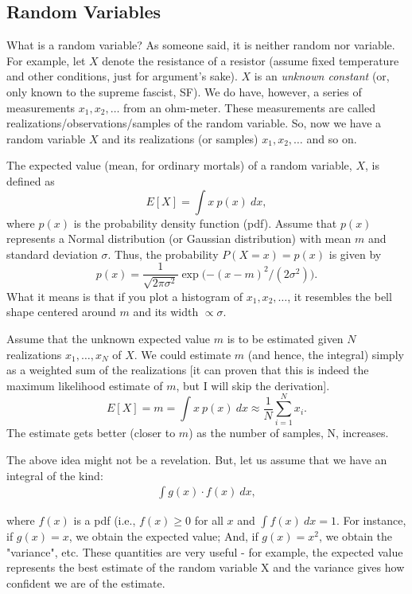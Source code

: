 \documentclass[11pt,onecolumn]{article}
\begin{document}
\subsection{Random Variables}
What is a random variable? As someone said, it is neither random nor variable. For example, let $X$ denote the resistance of a resistor (assume fixed temperature and other conditions, just for argument's sake). $X$ is an {\em unknown constant} (or, only known to the supreme fascist, SF). We do have, however, a series of measurements $x_1, x_2, \dots $ from an ohm-meter. These measurements are called realizations/observations/samples of the random variable. So, now we have a random variable $X$ and its realizations (or samples) $x_1, x_2, \dots $ and so on.

The expected value (mean, for ordinary mortals) of a random variable, $X$, is defined as
\[
E[X] = \int x~ p(x)~ dx,
\]
where $p(x)$ is the probability density function (pdf). Assume that $p(x)$ represents a Normal distribution (or Gaussian distribution) with mean $m$ and standard deviation $\sigma$. Thus, the probability $P(X = x) = p(x)$ is given by
\[
 p(x) = \frac{1}{\sqrt{2\pi \sigma^2}} \exp\biggl({-(x-m)^2/(2\sigma^2)}\biggr).
\]
What it means is that if you plot a histogram of  $x_1, x_2, \dots $, it resembles the bell shape centered around  $m$ and its width $\propto \sigma$.

Assume that the unknown expected value $m$ is to be estimated given $N$ realizations $x_1,\dots,x_N$ of $X$. We could estimate $m$ (and hence, the integral) simply as a weighted sum of the realizations [it can proven that this is indeed the maximum likelihood estimate of $m$, but I will skip the derivation].
\[
E[X] = m =  \int x~ p(x)~ dx \approx \frac{1}{N} \sum_{i=1}^N x_i.
\] 
The estimate gets better (closer to $m$) as the number of samples, N, increases.

The above idea might not be a revelation. But, let us assume that we have an integral of the kind:
\begin{align}
\int  g(x) \cdot f(x)~ dx ,
\label{eq:gxfx}
\end{align}


where $f(x)$ is a pdf (i.e., $f(x) \ge 0$ for all $x$ and $\int f(x)~dx = 1$.
For instance, if $g(x) = x$, we obtain the expected value; And, if $g(x) = x^2$, we obtain the 
"variance", etc. These quantities are very useful - for example, the expected 
 value represents the best estimate of the random variable X and the variance 
 gives how confident we are of the estimate.
\end{document}
